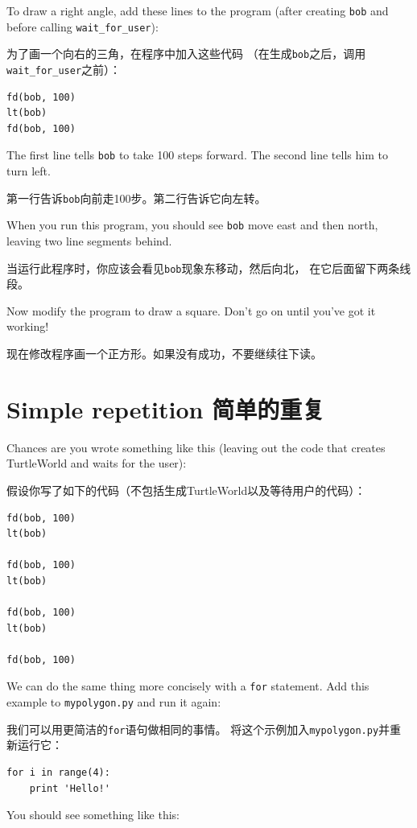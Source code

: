 \documentclass[10pt]{book}
\begin{document}
\begin{CJK}{UTF8}{gbsn}
To draw a right angle, add these lines to the program
(after creating {\tt bob} and before calling \verb"wait_for_user"):

为了画一个向右的三角，在程序中加入这些代码
（在生成{\tt bob}之后，调用\verb"wait_for_user"之前）：

\begin{verbatim}
fd(bob, 100)
lt(bob)
fd(bob, 100)
\end{verbatim}
%
The first line tells {\tt bob} to take 100 steps
forward.  The second line tells him to turn left.

第一行告诉{\tt bob}向前走100步。第二行告诉它向左转。

When you run this program, you should see {\tt bob} move east and then
north, leaving two line segments behind.

当运行此程序时，你应该会看见{\tt bob}现象东移动，然后向北，
在它后面留下两条线段。

Now modify the program to draw a square.  Don't go on until
you've got it working!

现在修改程序画一个正方形。如果没有成功，不要继续往下读。


\section{Simple repetition 简单的重复}
\label{repetition}

Chances are you wrote something like this (leaving out the code
that creates TurtleWorld and waits for the user):

假设你写了如下的代码（不包括生成TurtleWorld以及等待用户的代码）：

\begin{verbatim}
fd(bob, 100)
lt(bob)

fd(bob, 100)
lt(bob)

fd(bob, 100)
lt(bob)

fd(bob, 100)
\end{verbatim}
%
We can do the same thing more concisely with a {\tt for} statement.
Add this example to {\tt mypolygon.py} and run it again:

我们可以用更简洁的{\tt for}语句做相同的事情。
将这个示例加入{\tt mypolygon.py}并重新运行它：

\begin{verbatim}
for i in range(4):
    print 'Hello!'
\end{verbatim}
%
You should see something like this:


\end{CJK}
\end{document}
